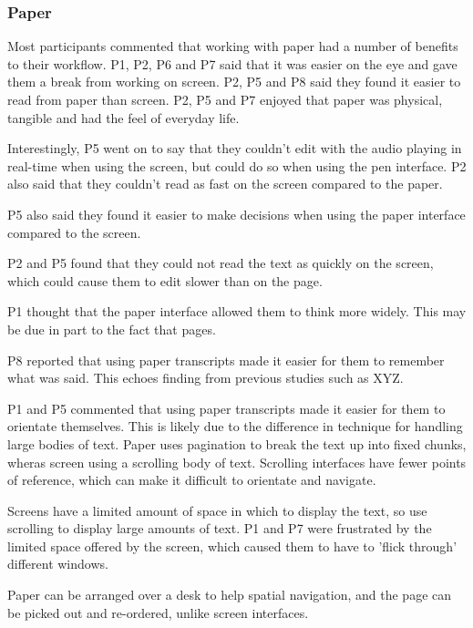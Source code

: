 \subsubsection{Paper}


Most participants commented that working with paper had a number of benefits to their workflow. P1, P2, P6 and P7 said
that it was easier on the eye and gave them a break from working on screen. P2, P5 and P8 said they found it easier to
read from paper than screen. P2, P5 and P7 enjoyed that paper was physical, tangible and had the feel of everyday life.


Interestingly, P5 went on to say that they couldn't edit with the audio playing in real-time when using the screen, but
could do so when using the pen interface. P2 also said that they couldn't read as fast on the screen compared to the
paper.

P5 also said they found it easier to make decisions when using the paper interface compared to the screen.

P2 and P5 found that they could not read the text as quickly on the screen, which could cause them to edit slower than
on the page.

P1 thought that the paper interface allowed them to think more widely. This may be due in part to the fact that pages.

P8 reported that using paper transcripts made it easier for them to remember what was said. This echoes finding from
previous studies such as XYZ.


P1 and P5 commented that using paper transcripts made it easier for them to orientate themselves. This is likely due to
the difference in technique for handling large bodies of text. Paper uses pagination to break the text up into fixed
chunks, wheras screen using a scrolling body of text. Scrolling interfaces have fewer points of reference, which can
make it difficult to orientate and navigate.

Screens have a limited amount of space in which to display the text, so use scrolling to display large amounts of text.
P1 and P7 were frustrated by the limited space offered by the screen, which caused them to have to 'flick through'
different windows.

Paper can be arranged over a desk to help spatial navigation, and the page can be picked out and re-ordered, unlike
screen interfaces.

